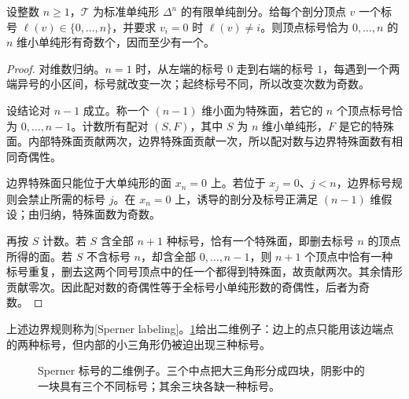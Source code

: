 \begin{lemma}[Sperner]
\label{b2:lem:H3-sperner}
设整数 \(n\ge1\)，\(\mathcal T\) 为标准单纯形 \(\Delta^n\) 的有限单纯剖分。给每个剖分顶点 \(v\) 一个标号 \(\ell(v)\in\{0,\ldots,n\}\)，并要求 \(v_i=0\) 时 \(\ell(v)\ne i\)。则顶点标号恰为 \(0,\ldots,n\) 的 \(n\) 维小单纯形有奇数个，因而至少有一个。
\end{lemma}
\begin{proof}
对维数归纳。\(n=1\) 时，从左端的标号 \(0\) 走到右端的标号 \(1\)，每遇到一个两端异号的小区间，标号就改变一次；起终标号不同，所以改变次数为奇数。

设结论对 \(n-1\) 成立。称一个 \((n-1)\) 维小面为特殊面，若它的 \(n\) 个顶点标号恰为 \(0,\ldots,n-1\)。计数所有配对 \((S,F)\)，其中 \(S\) 为 \(n\) 维小单纯形，\(F\) 是它的特殊面。内部特殊面贡献两次，边界特殊面贡献一次，所以配对数与边界特殊面数有相同奇偶性。

边界特殊面只能位于大单纯形的面 \(x_n=0\) 上。若位于 \(x_j=0\)、\(j<n\)，边界标号规则会禁止所需的标号 \(j\)。在 \(x_n=0\) 上，诱导的剖分及标号正满足 \((n-1)\) 维假设；由归纳，特殊面数为奇数。

再按 \(S\) 计数。若 \(S\) 含全部 \(n+1\) 种标号，恰有一个特殊面，即删去标号 \(n\) 的顶点所得的面。若 \(S\) 不含标号 \(n\)，却含全部 \(0,\ldots,n-1\)，则 \(n+1\) 个顶点中恰有一种标号重复，删去这两个同号顶点中的任一个都得到特殊面，故贡献两次。其余情形贡献零次。因此配对数的奇偶性等于全标号小单纯形数的奇偶性，后者为奇数。
\end{proof}

上述边界规则称为[Sperner labeling]。\cref{b2:fig:H3-sperner}给出二维例子：边上的点只能用该边端点的两种标号，但内部的小三角形仍被迫出现三种标号。

\begin{figure}[htbp]
\centering
{}
\caption[Sperner 标号的二维例子]{Sperner 标号的二维例子。三个中点把大三角形分成四块，阴影中的一块具有三个不同标号；其余三块各缺一种标号。}
\label{b2:fig:H3-sperner}
\end{figure}

